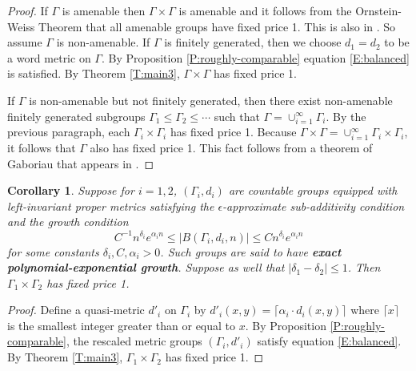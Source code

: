 \documentclass[12pt]{article}
\theoremstyle{plain}
\newtheorem{cor}[thm]{Corollary}
\theoremstyle{definition}
\theoremstyle{remark}
\newcommand{\G}{\Gamma}
\newcommand{\eps}{\epsilon}
\renewcommand\a{\alpha}
\renewcommand\d{\delta}
\begin{document}
\begin{proof}
If $\G$ is amenable then $\G \times \G$ is amenable and it follows from the Ornstein-Weiss Theorem \cite{OW80} that all amenable groups have fixed price 1. This is also in \cite[Corollary 31.2]{MR2095154}. So assume $\G$ is non-amenable.    If $\G$ is finitely generated, then we choose $d_1=d_2$ to be a word metric on $\G$. By Proposition \ref{P:roughly-comparable} equation \eqref{E:balanced} is satisfied.  By Theorem \ref{T:main3}, $\G\times \G$ has fixed price 1.

If $\G$ is non-amenable but not finitely generated, then there exist non-amenable finitely generated subgroups $\G_1 \le \G_2 \le \cdots $ such that $\G = \cup_{i=1}^\infty \G_i$. By the previous paragraph, each $\G_i\times \G_i$ has fixed price 1. Because $\G \times \G = \cup_{i=1}^\infty \G_i \times \G_i$, it follows that $\G$ also has fixed price 1. This fact follows from a theorem of Gaboriau that appears in \cite[Proposition 32.1 (ii)]{MR2095154}.
\end{proof}



\begin{cor}\label{C:poly-exp}
Suppose for $i=1,2$, $(\G_i,d_i)$ are countable groups equipped with left-invariant proper metrics satisfying the $\eps$-approximate sub-additivity condition and  the growth condition
$$C^{-1} n^{\d_i} e^{\a_i n} \le |B(\G_i,d_i,n)| \le C n^{\d_i} e^{\a_i n}$$
for some constants $\d_i, C, \a_i>0$. Such groups are said to have {\bf exact polynomial-exponential growth}. Suppose as well that $|\d_1-\d_2|\le 1$. Then $\G_1\times \G_2$ has fixed price 1.
\end{cor}

\begin{proof}
Define a quasi-metric $d'_i$ on $\G_i$ by $d'_i(x,y)=\lceil\alpha_i\cdot d_i(x,y)\rceil$ where $\lceil x\rceil$ is the smallest integer greater than or equal to $x$. By Proposition \ref{P:roughly-comparable}, the rescaled metric groups $(\G_i,d'_i)$ satisfy  equation \eqref{E:balanced}.  By Theorem \ref{T:main3}, $\G_1\times \G_2$ has fixed price 1.
\end{proof}
\end{document}
